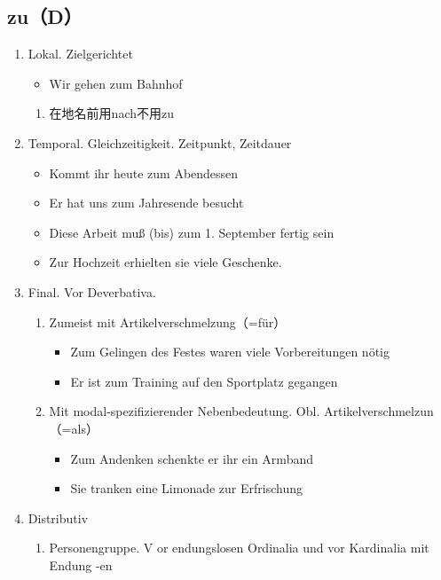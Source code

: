 \documentclass[UTF8]{report}
\begin{document}
\subsection{zu（D）}
\begin{enumerate}
    \item Lokal. Zielgerichtet
    \begin{itemize}
        \item Wir gehen zum Bahnhof
    \end{itemize}
    \begin{enumerate}
        \item 在地名前用nach不用zu
    \end{enumerate}
    \item Temporal. Gleichzeitigkeit. Zeitpunkt, Zeitdauer
    \begin{itemize}
        \item Kommt ihr heute zum Abendessen
        \item Er hat uns zum Jahresende besucht
        \item Diese Arbeit muß (bis) zum 1. September fertig sein
        \item Zur Hochzeit erhielten sie viele Geschenke.
    \end{itemize}
    \item Final. Vor Deverbativa.
    \begin{enumerate}
        \item Zumeist mit Artikelverschmelzung（=für）
        \begin{itemize}
            \item Zum Gelingen des Festes waren viele Vorbereitungen nötig
            \item Er ist zum Training auf den Sportplatz gegangen
        \end{itemize}
        \item Mit modal-spezifizierender Nebenbedeutung. Obl. Artikelverschmelzun（=als）
        \begin{itemize}
            \item Zum Andenken schenkte er ihr ein Armband
            \item Sie tranken eine Limonade zur Erfrischung
        \end{itemize}
    \end{enumerate}
    \item Distributiv
    \begin{enumerate}
        \item Personengruppe. V or endungslosen Ordinalia und vor Kardinalia mit Endung -en 

\end{enumerate}
\end{enumerate}
\end{document}
